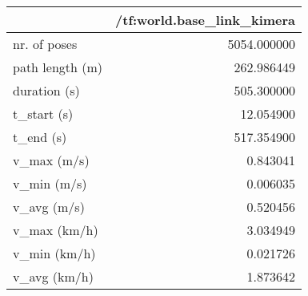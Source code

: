 \begin{tabular}{lr}
\toprule
{} &  /tf:world.base\_link\_kimera \\
\midrule
nr. of poses    &                 5054.000000 \\
path length (m) &                  262.986449 \\
duration (s)    &                  505.300000 \\
t\_start (s)     &                   12.054900 \\
t\_end (s)       &                  517.354900 \\
v\_max (m/s)     &                    0.843041 \\
v\_min (m/s)     &                    0.006035 \\
v\_avg (m/s)     &                    0.520456 \\
v\_max (km/h)    &                    3.034949 \\
v\_min (km/h)    &                    0.021726 \\
v\_avg (km/h)    &                    1.873642 \\
\bottomrule
\end{tabular}
